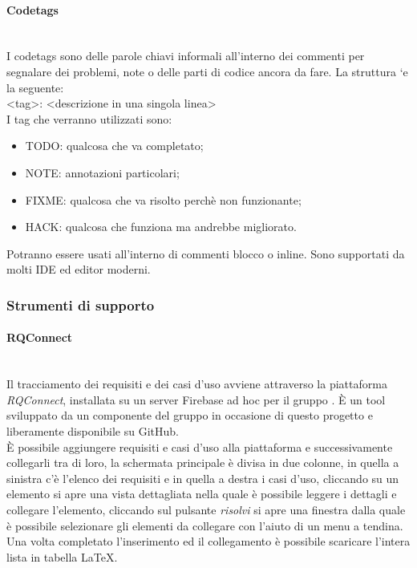 \paragraph{Codetags}\mbox{}\\
I codetags sono delle parole chiavi informali all'interno dei commenti per segnalare
dei problemi, note o delle parti di codice ancora da fare. La struttura `e la seguente: \\
<tag>: <descrizione in una singola linea>\\
I tag che verranno utilizzati sono:\\
\begin{itemize}
\item TODO: qualcosa che va completato;
\item NOTE: annotazioni particolari;
\item FIXME: qualcosa che va risolto perchè non funzionante;
\item HACK: qualcosa che funziona ma andrebbe migliorato.
\end{itemize}
Potranno essere usati all’interno di commenti blocco o inline. Sono supportati da
molti IDE ed editor moderni.



\subsubsection{Strumenti di supporto}
\paragraph{RQConnect}\mbox{}\\ \label{sec:Trac}
Il tracciamento dei requisiti e dei casi d’uso avviene attraverso la piattaforma 
\textit{RQConnect}, installata su un server {Firebase} ad hoc per il gruppo \gruppo.
 È  un tool sviluppato da un componente del gruppo in occasione di questo progetto e 
 liberamente disponibile su GitHub.\\ È possibile aggiungere requisiti e casi d’uso 
 alla piattaforma e successivamente collegarli tra di loro, la schermata principale è 
 divisa in due colonne, in quella a sinistra c’è l’elenco dei requisiti e in quella a 
 destra i casi d’uso, cliccando su un elemento si apre una vista dettagliata nella quale 
 è possibile leggere i dettagli e collegare l’elemento, cliccando sul pulsante \textit{risolvi} si 
 apre una finestra dalla quale è possibile selezionare gli elementi da collegare con l’aiuto 
 di un menu a tendina.\\Una volta completato l’inserimento ed il collegamento è possibile scaricare 
 l’intera lista in tabella \LaTeX.

